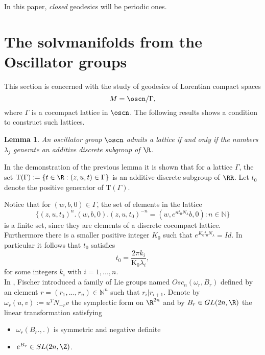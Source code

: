 \documentclass[12pt]{amsart}
\theoremstyle{plain}
\newtheorem{lem}[thm]{Lemma}
\theoremstyle{definition}
\theoremstyle{remark}
\begin{document}
In this paper, {\em closed} geodesics will be periodic ones.
	

	
	\section{The solvmanifolds from the Oscillator groups}\label{sectionosc}
	
	This section is concerned with the study of geodesics of Lorentian compact spaces  $$M=\oscn/ \Gamma,$$ where $\Gamma$ is a cocompact lattice in $\oscn$. The following results shows a condition to construct such lattices. 
	
	\begin{lem}\cite{MeRe}\label{lema_medina}
		An oscillator group $\oscn$ admits a lattice if and only if the numbers $\lambda_j$ generate an additive discrete subgroup of $\R$.
	\end{lem}
	
	In the demonstration of the previous lemma it is  shown that for a lattice $\Gamma$, the set $\mathrm{T}(\Gamma):=\{ t \in \R : (z,u,t) \in \Gamma \}$ is an additive discrete subgroup of $\RR$. %
	 Let $t_0$ denote the positive generator of $\mathrm{T}(\Gamma)$. 
	
	Notice that for $(w,b,0) \in \Gamma$, the set of elements in the lattice
	\begin{equation*}
		\{ (z,u,t_0)^n.(w,b,0).(z,u,t_0)^{-n}=(w,e^{n t_0 N_{\lambda}}b,0) : n \in \mathbb{N} \}
	\end{equation*}
	 is a finite set, since they are elements of a discrete cocompact lattice. Furthermore there is a smaller positive integer $K_0$ such that $e^{K_0 t_0 N_{\lambda}} = Id$. In particular it follows that $t_0$ satisfies
	\begin{equation} \label{oscilator-N}
		t_0=\frac{2 \pi k_i}{\mathrm{K_0} \lambda_i},
	\end{equation}
	for some integers $k_i$ with $i=1, ..., n$.\\
	
	In \cite{MF}, Fischer introduced a family of Lie groups named $Osc_n(\omega_r, B_r)$ defined by an element $r=(r_1, ..., r_n) \in \mathbb{N}^n$ such that $r_i | r_{i+1}$. Denote by $\omega_r(u,v):=u^TN_{-r}v$ the symplectic form on $\R^{2n}$ and by $B_r \in GL(2n, \R)$ the linear transformation satisfying
	
	\begin{itemize}
		\item $\omega_r(B_r.,.)$ is symmetric and negative definite
		\item $e^{B_r} \in SL(2n,\Z)$.
	\end{itemize}
	
\end{document}
